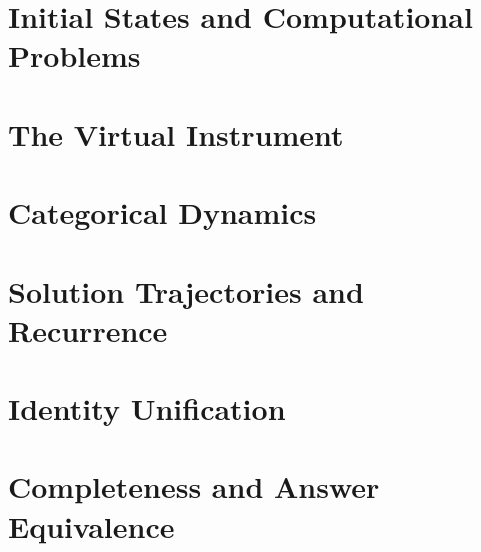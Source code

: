 

\section{Initial States and Computational Problems}
\label{sec:initial_state}



\section{The Virtual Instrument}
\label{sec:virtual_instrument}



\section{Categorical Dynamics}
\label{sec:categorical_dynamics}



\section{Solution Trajectories and Recurrence}
\label{sec:solution_trajectory}



\section{Identity Unification}
\label{sec:identity_unification}



\section{Completeness and Answer Equivalence}
\label{sec:completeness}



